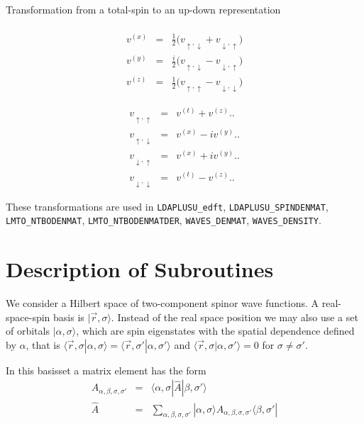 \documentclass[11pt,a4paper]{report}
\begin{document}
\begin{myshadowminipage}{Transformation from a total-spin 
to an up-down representation}
\begin{minipage}{0.45\linewidth}
\begin{eqnarray*}
\\
v^{(x)}&=&\frac{1}{2}\biggl(v_{\uparrow,\downarrow}+v_{\downarrow,\uparrow}\biggr)
\\
v^{(y)}&=&\frac{i}{2}\biggl(v_{\uparrow,\downarrow}-v_{\downarrow,\uparrow}\biggr)
\\
v^{(z)}&=&\frac{1}{2}\biggl(v_{\uparrow,\uparrow}-v_{\downarrow,\downarrow}\biggr)
\end{eqnarray*}
\end{minipage}
\begin{minipage}{0.45\linewidth}
\begin{eqnarray*}
v_{\uparrow,\uparrow}&=&v^{(t)}+v^{(z)}\biggl.\biggr.
\\
v_{\uparrow,\downarrow}&=&v^{(x)}-iv^{(y)}\biggl.\biggr.
\\
v_{\downarrow,\uparrow}&=&v^{(x)}+iv^{(y)}\biggl.\biggr.
\\
v_{\downarrow,\downarrow}&=&v^{(t)}-v^{(z)}\biggl.\biggr.
\end{eqnarray*}
\end{minipage}
\end{myshadowminipage}

These transformations are used in \verb|LDAPLUSU_edft|,
\verb|LDAPLUSU_SPINDENMAT|, \verb|LMTO_NTBODENMAT|,
\verb|LMTO_NTBODENMATDER|, \verb|WAVES_DENMAT|, \verb|WAVES_DENSITY|.

\section{Description of Subroutines}
\cite{bloechl94_prb50_17953}

We consider a Hilbert space of two-component spinor wave functions.  A
real-space-spin basis is $|\vec{r},\sigma\rangle$. Instead of the real
space position we may also use a set of orbitals
$|\alpha,\sigma\rangle$, which are spin eigenstates with the spatial
dependence defined by $\alpha$, that is
$\langle\vec{r},\sigma|\alpha,\sigma\rangle=
\langle\vec{r},\sigma'|\alpha,\sigma'\rangle$ and
$\langle\vec{r},\sigma|\alpha,\sigma'\rangle=0$ for
$\sigma\neq\sigma'$.


In this basisset a matrix element has the form
\begin{eqnarray*}
A_{\alpha,\beta,\sigma,\sigma'}&=&\langle\alpha,\sigma|\hat{A}|\beta,\sigma'\rangle
\nonumber\\
\hat{A}&=&\sum_{\alpha,\beta,\sigma,\sigma'}
|\alpha,\sigma\rangle A_{\alpha,\beta,\sigma,\sigma'} 
\langle\beta,\sigma'|
\end{eqnarray*}
\end{document}
